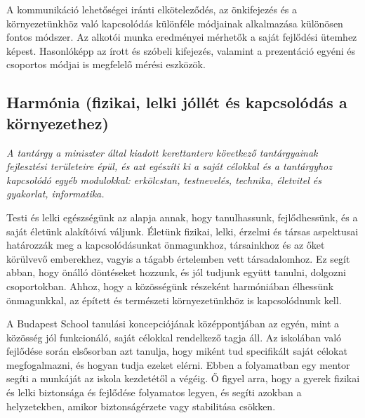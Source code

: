 A kommunikáció lehetőségei iránti elköteleződés, az önkifejezés és a környezetünkhöz való kapcsolódás különféle módjainak alkalmazása különösen fontos módszer. Az alkotói munka eredményei mérhetők a saját fejlődési ütemhez képest. Hasonlóképp az írott és szóbeli kifejezés, valamint a prezentáció egyéni és csoportos módjai is megfelelő mérési eszközök.

\subsection[Harmónia]{Harmónia (fizikai, lelki jóllét és kapcsolódás a környezethez)}
\emph{A tantárgy a miniszter által kiadott kerettanterv következő tantárgyainak fejlesztési területeire épül, és azt egészíti ki a saját célokkal és a tantárgyhoz kapcsolódó egyéb modulokkal: erkölcstan, testnevelés, technika, életvitel és gyakorlat, informatika.}

Testi és lelki egészségünk az alapja annak, hogy tanulhassunk, fejlődhessünk, és a saját életünk alakítóivá váljunk. Életünk fizikai, lelki, érzelmi és társas aspektusai határozzák meg a kapcsolódásunkat önmagunkhoz, társainkhoz és az őket körülvevő emberekhez, vagyis a tágabb értelemben vett társadalomhoz. Ez segít abban, hogy önálló döntéseket hozzunk, és jól tudjunk együtt tanulni, dolgozni csoportokban. Ahhoz, hogy a közösségünk részeként harmóniában élhessünk önmagunkkal, az épített és természeti környezetünkhöz is kapcsolódnunk kell.


A Budapest School tanulási koncepciójának középpontjában az egyén, mint a közösség jól funkcionáló, saját célokkal rendelkező tagja áll. Az iskolában való fejlődése során elsősorban azt tanulja, hogy miként tud specifikált saját célokat megfogalmazni, és hogyan tudja ezeket elérni. Ebben a folyamatban egy mentor segíti a munkáját az iskola kezdetétől a végéig. Ő figyel arra, hogy a gyerek fizikai és lelki biztonsága és fejlődése folyamatos legyen, és segíti azokban a helyzetekben, amikor biztonságérzete vagy stabilitása csökken.

